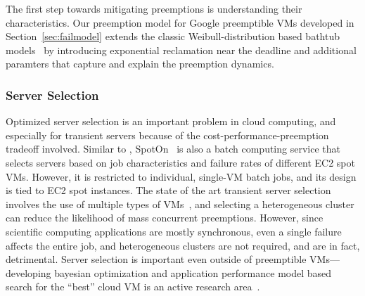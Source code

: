 The first step towards mitigating preemptions is understanding their characteristics. 
Our preemption model for Google preemptible VMs developed in Section~\ref{sec:failmodel} extends the classic Weibull-distribution based bathtub models~\cite{Crevecour} by introducing exponential reclamation near the deadline and additional paramters that capture and explain the preemption dynamics. 

\vspace*{\subsecspace}
\subsubsection{Server Selection}

Optimized server selection is an important problem in cloud computing, and especially for transient servers because of the cost-performance-preemption tradeoff involved. 
Similar to \sysname, SpotOn~\cite{spoton} is also a batch computing service that selects servers based on job characteristics and failure rates of different EC2 spot VMs. However, it is restricted to individual, single-VM batch jobs, and its design is tied to EC2 spot instances.
The state of the art transient server selection involves the use of multiple types of VMs~\cite{exosphere}, and selecting a heterogeneous cluster can reduce the likelihood of mass concurrent preemptions.
However, since scientific computing applications are mostly synchronous, even a single failure affects the entire job, and heterogeneous clusters are not required, and are in fact, detrimental. 
Server selection is important even outside of preemptible VMs---developing bayesian optimization and application performance model based search for the ``best'' cloud VM is an active research area~\cite{alipourfard_cherrypick, yadwadkar_selecting_2017}. 



\vspace*{\subsecspace}







